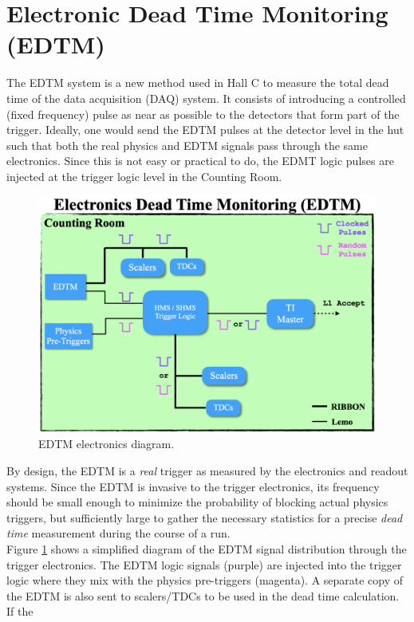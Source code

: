 \documentclass[11pt]{article}
\begin{document}
\section{Electronic Dead Time Monitoring (EDTM)}\label{sec:edtm}
\noindent The EDTM system is a new method used in Hall C to measure the total dead time of the data acquisition (DAQ) system. It consists of introducing a controlled (fixed frequency) pulse
as near as possible to the detectors that form part of the trigger. Ideally, one would send the EDTM pulses at the detector level in the hut such that both the real physics and EDTM signals
pass through the same electronics. Since this is not easy or practical to do, the EDMT logic pulses are injected at the trigger logic level in the Counting Room.\\
\begin{figure}[H]
  \centering
  \includegraphics[scale=0.54]{EDTM_diagram.png}
  \caption{EDTM electronics diagram.}
  \label{fig:EDTM_diagram}
\end{figure}
\indent By design, the EDTM is a \textit{real} trigger as measured by the electronics and readout systems. Since the EDTM is invasive to the trigger electronics, its frequency should be small
enough to minimize the probability of blocking actual physics triggers, but sufficiently large to gather the necessary statistics for a precise \textit{dead time} measurement during the course of a run. \\
\indent Figure \ref{fig:EDTM_diagram} shows a simplified diagram of the EDTM signal distribution through the trigger electronics. The EDTM logic signals (purple) are injected into the trigger logic
where they mix with the physics pre-triggers (magenta). A separate copy of the EDTM is also sent to scalers/TDCs to be used in the dead time calculation. If the
\end{document}
